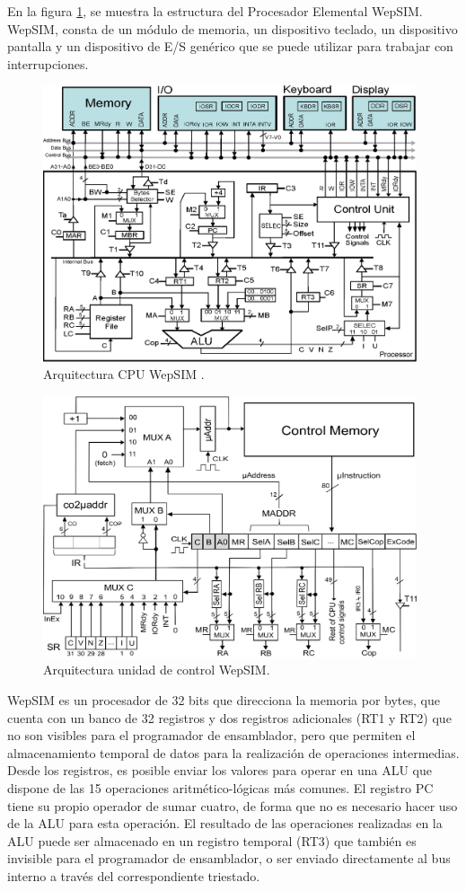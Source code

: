 En la figura \ref{fig:wepsimCPU_figure}, se muestra la estructura del Procesador Elemental WepSIM. WepSIM, consta de un módulo de memoria, un dispositivo teclado, un dispositivo pantalla y un dispositivo de E/S genérico que se puede utilizar para trabajar con interrupciones.

\begin{figure}[htbp]
 	\centering
 	\includegraphics[width=11cm]{figures/processor6}
 	\caption{Arquitectura CPU WepSIM .}
	\label{fig:wepsimCPU_figure}
\end{figure}

\begin{figure}[htbp]
 	\centering
 	\includegraphics[width=11cm]{figures/controlunit6}
 	\caption{Arquitectura unidad de control WepSIM.}
	\label{fig:wepsimCU_figure}
\end{figure}

WepSIM es un procesador de 32 bits que direcciona la memoria por bytes, que cuenta con un banco de 32 registros y dos registros adicionales (RT1 y RT2) que no son visibles para el programador de ensamblador, pero que permiten el almacenamiento temporal de datos para la realización de operaciones intermedias. Desde los registros, es posible enviar los valores para operar en una ALU que dispone de las 15 operaciones aritmético-lógicas más comunes. El registro PC tiene su propio operador de sumar cuatro, de forma que no es necesario hacer uso de la ALU para esta operación. El resultado de las operaciones realizadas en la ALU puede ser almacenado en un registro temporal (RT3) que también es invisible para el programador de ensamblador, o ser enviado directamente al bus interno a través del correspondiente triestado.

